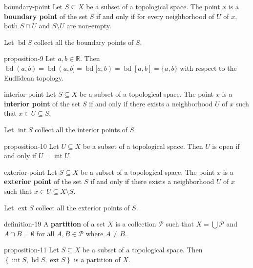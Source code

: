 \documentclass[10pt,]{article}
\newcommand{\terminology}[1]{\textbf{#1}}
\newcommand{\mb}{\mathbb}
\newcommand{\mc}{\mathcal}
\newcommand{\int}{\operatorname{int}}
\newcommand{\ext}{\operatorname{ext}}
\newcommand{\bd}{\operatorname{bd}}
\newcommand{\setList}[1]{\left\{#1\right\}}
\begin{document}
\begin{definition}{}{boundary-point}%
\hypertarget{p-52}{}%
Let \(S\subseteq X\) be a subset of a topological space. The point \(x\) is a \terminology{boundary point} of the set \(S\) if and only if for every neighborhood of \(U\) of \(x\), both \(S\cap U\) and \(S\setminus U\) are non-empty.%
\par
\hypertarget{p-53}{}%
Let \(\bd S\) collect all the boundary points of \(S\).%
\end{definition}
\begin{proposition}{}{}{proposition-9}%
\hypertarget{p-54}{}%
Let \(a,b\in\mb R\). Then \(\bd (a,b)=\bd (a,b]=\bd [a,b)=\bd [a,b]=\{a,b\}\) with respect to the Eudlidean topology.%
\end{proposition}
\begin{definition}{}{interior-point}%
\hypertarget{p-55}{}%
Let \(S\subseteq X\) be a subset of a topological space. The point \(x\) is a \terminology{interior point} of the set \(S\) if and only if there exists a neighborhood \(U\) of \(x\) such that \(x\in U\subseteq S\).%
\par
\hypertarget{p-56}{}%
Let \(\int S\) collect all the interior points of \(S\).%
\end{definition}
\begin{proposition}{}{}{proposition-10}%
\hypertarget{p-57}{}%
Let \(U\subseteq X\) be a subset of a topological space. Then \(U\) is open if and only if \(U=\int U\).%
\end{proposition}
\begin{definition}{}{exterior-point}%
\hypertarget{p-58}{}%
Let \(S\subseteq X\) be a subset of a topological space. The point \(x\) is a \terminology{exterior point} of the set \(S\) if and only if there exists a neighborhood \(U\) of \(x\) such that \(x\in U\subseteq X\setminus S\).%
\par
\hypertarget{p-59}{}%
Let \(\ext S\) collect all the exterior points of \(S\).%
\end{definition}
\begin{definition}{}{definition-19}%
\hypertarget{p-60}{}%
A \terminology{partition} of a set \(X\) is a collection \(\mc P\) such that \(X=\bigcup\mc P\) and \(A\cap B=\emptyset\) for all \(A,B\in\mc P\) where \(A\not=B\).%
\end{definition}
\begin{proposition}{}{}{proposition-11}%
\hypertarget{p-61}{}%
Let \(S\subseteq X\) be a subset of a topological space. Then \(\setList{\int S,\bd S,\ext S}\) is a partition of \(X\).%
\end{proposition}
\end{document}
